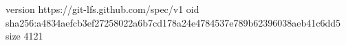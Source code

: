 version https://git-lfs.github.com/spec/v1
oid sha256:a4834aefcb3ef27258022a6b7cd178a24e4784537e789b62396038aeb41c6dd5
size 4121
